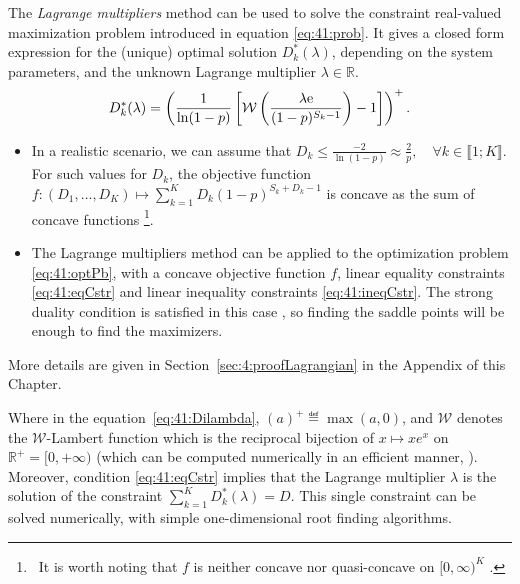 \begin{proposition}\label{prop:41:Lagrangian}
\begin{leftbar}[propositionbar]  %
    The \emph{Lagrange multipliers} method \cite{BoydVanderberghe04} can be used to solve the constraint real-valued maximization problem introduced in equation \eqref{eq:41:prob}.
    It gives a closed form expression for the (unique) optimal solution $D_k^*(\lambda)$, depending on the system parameters, and the unknown Lagrange multiplier $\lambda \in \mathbb{R}$.
    \begin{equation}\label{eq:41:Dilambda}
        D_k^*(\lambda) = \left(\frac{1}{\ln(1-p)}\left[ \mathcal{W}\left(\frac{\lambda \mathrm{e}}{(1-p)^{S_k-1}} \right)-1 \right]\right)^{+} .
    \end{equation}
\end{leftbar}  %
\end{proposition}
%
\begin{smallproof}
\begin{itemize}
    \item
    In a realistic scenario, we can assume that $D_k\leq \frac{-2}{\ln\left(1-p\right)} \approx \frac{2}{p},\quad \forall k\in\llbracket 1;K \rrbracket$. For such values for $D_k$, the objective function $f: (D_1, \dots, D_{K}) \mapsto \sum_{k=1}^{K} D_k (1 - p)^{S_k + D_k -1}$ is concave as the sum of concave functions
    \footnote{~It is worth noting that $f$ is neither concave nor quasi-concave on $[0,\infty)^{K}$ \cite{Luenberger68,Yaari77}.}.
    \item
    The Lagrange multipliers method can be applied to the optimization problem \eqref{eq:41:optPb}, with a concave objective function $f$, linear equality constraints \eqref{eq:41:eqCstr} and linear inequality constraints \eqref{eq:41:ineqCstr}. The strong duality condition is satisfied in this case \cite{BoydVanderberghe04}, so finding the saddle points will be enough to find the maximizers.
    \end{itemize}
    More details are given in Section~\ref{sec:4:proofLagrangian} in the Appendix of this Chapter.
\end{smallproof}

Where in the equation~\eqref{eq:41:Dilambda}, $(a)^{+} \eqdef \max(a,0)$, and $\mathcal{W}$ denotes the $\mathcal{W}$-Lambert function which is the reciprocal bijection of $x \mapsto x e^x$ on $\mathbb{R^+} = [0, +\infty)$ (which can be computed numerically in an efficient manner, \cite{Corless96}).
Moreover, condition \eqref{eq:41:eqCstr} implies that the Lagrange multiplier $\lambda$ is the solution of the constraint $\sum_{k=1}^{K} D_k^*(\lambda) = D$.
This single constraint can be solved numerically, with simple one-dimensional root finding algorithms.

